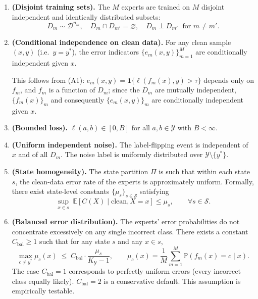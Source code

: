 \begin{enumerate}
\item[\textbf{(A1)}] \textbf{(Disjoint training sets).}
  The $M$ experts are trained on $M$ disjoint independent and identically
  distributed subsets:
  \begin{equation}
  D_m \sim \mathcal{D}^{n_m},\quad D_m \cap D_{m'} = \varnothing,\quad
  D_m \perp D_{m'} \;\text{ for } m \neq m'.
  \label{eq:a1}
  \end{equation}

\item[\textbf{(A2)}] \textbf{(Conditional independence on clean data).}
  For any clean sample $(x,y)$ (i.e.\ $y = y^*$), the error indicators
  $\{e_m(x,y)\}_{m=1}^M$ are conditionally independent given $x$.
  \begin{remark}
  This follows from (A1): $e_m(x,y) = \mathbf{1}\{\ell(f_m(x),y) > \tau\}$
  depends only on $f_m$, and $f_m$ is a function of $D_m$; since the $D_m$
  are mutually independent, $\{f_m(x)\}_m$ and consequently
  $\{e_m(x,y)\}_m$ are conditionally independent given $x$.
  \end{remark}

\item[\textbf{(A3)}] \textbf{(Bounded loss).}
  $\ell(a,b) \in [0,B]$ for all $a,b \in \mathcal{Y}$ with $B < \infty$.

\item[\textbf{(A4)}] \textbf{(Uniform independent noise).}
  The label-flipping event is independent of $x$ and of all $D_m$. The noise
  label is uniformly distributed over $\mathcal{Y} \setminus \{y^*\}$.

\item[\textbf{(A5)}] \textbf{(State homogeneity).}
  The state partition $\Pi$ is such that within each state $s$, the clean-data
  error rate of the experts is approximately uniform. Formally, there exist
  state-level constants $\{\mu_s\}_{s \in \mathcal{S}}$ satisfying
  \begin{equation}
  \sup_{x \in s} \; \mathbb{E}[C(X) \mid \text{clean}, X = x] \leq \mu_s,
  \qquad \forall s \in \mathcal{S}.
  \label{eq:a5}
  \end{equation}

\item[\textbf{(A6)}] \textbf{(Balanced error distribution).}
  The experts' error probabilities do not concentrate excessively on any
  single incorrect class. There exists a constant $C_{\text{bal}} \geq 1$
  such that for any state $s$ and any $x \in s$,
  \begin{equation}
  \max_{c \neq y^*} \mu_c(x) \;\leq\; C_{\text{bal}} \cdot
  \frac{\mu_s}{K_{\mathcal{Y}} - 1},
  \qquad
  \mu_c(x) = \frac{1}{M}\sum_{m=1}^M \mathbb{P}(f_m(x) = c \mid x).
  \label{eq:a6}
  \end{equation}
  The case $C_{\text{bal}} = 1$ corresponds to perfectly uniform errors
  (every incorrect class equally likely). $C_{\text{bal}} = 2$ is a
  conservative default. This assumption is empirically testable.
\end{enumerate}

